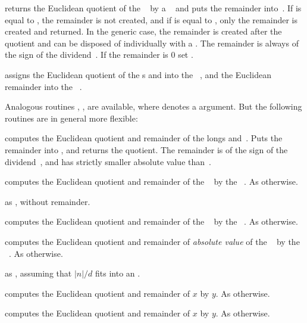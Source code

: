  returns the Euclidean quotient of the
~ by a ~ and puts the remainder
into~. If  is equal to , the remainder is not
created, and if  is equal to  , only the remainder is
created and returned. In the generic case, the remainder is created after the
quotient and can be disposed of individually with a . The
remainder is always of the sign of the dividend~. If the remainder
is $0$ set .

 assigns the Euclidean
quotient of the s  and  into the ~,
and the Euclidean remainder into the ~.

\noindent Analogous routines \kbd{[z]}, \kbd{[z]},
\kbd{[z]} are available, where  denotes a 
argument. But the following routines are in general more flexible:

 computes the Euclidean
quotient and remainder of the longs  and~. Puts the remainder
into , and returns the quotient. The remainder is of the sign of the
dividend~, and has strictly smaller absolute value than~.

 computes the Euclidean
quotient and remainder of the ~ by the ~. As
 otherwise.

 as , without
remainder.

 computes the Euclidean quotient
and remainder of the ~ by the ~. As
 otherwise.

 computes the Euclidean quotient
and remainder of \emph{absolute value} of the ~ by the
~. As  otherwise.

 as , assuming
that $|n|/d$ fits into an .

computes the Euclidean quotient and remainder of $x$ by $y$. As
 otherwise.

computes the Euclidean quotient and remainder of $x$ by $y$. As
 otherwise.

